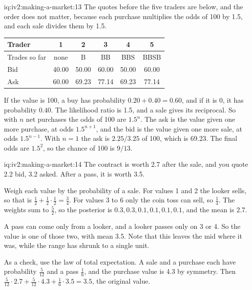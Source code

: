 \begin{solution}{iq:iv2:making-a-market:13}
The quotes before the five traders are below, and the order does not matter, because each purchase multiplies the odds of 100 by 1.5, and each sale divides them by 1.5.
\begin{center}\small
\begin{tabular}{@{}lccccc@{}}
Trader & 1 & 2 & 3 & 4 & 5 \\ \hline
Trades so far & none & B & BB & BBS & BBSB \\
Bid & 40.00 & 50.00 & 60.00 & 50.00 & 60.00 \\
Ask & 60.00 & 69.23 & 77.14 & 69.23 & 77.14
\end{tabular}
\end{center}

If the value is 100, a buy has probability $0.20 + 0.40 = 0.60$, and if it is 0, it has probability $0.40$. The likelihood ratio is 1.5, and a sale gives its reciprocal. So with $n$ net purchases the odds of 100 are $1.5^n$. The ask is the value given one more purchase, at odds $1.5^{n+1}$, and the bid is the value given one more sale, at odds $1.5^{n-1}$. With $n = 1$ the ask is $2.25/3.25$ of 100, which is 69.23. The final odds are $1.5^2$, so the chance of 100 is $9/13$.

\end{solution}

\begin{solution}{iq:iv2:making-a-market:14}
The contract is worth 2.7 after the sale, and you quote 2.2 bid, 3.2 asked. After a pass, it is worth 3.5.

Weigh each value by the probability of a sale. For values 1 and 2 the looker sells, so that is $\tfrac12 + \tfrac12 \cdot \tfrac12 = \tfrac34$. For values 3 to 6 only the coin toss can sell, so $\tfrac14$. The weights sum to $\tfrac52$, so the posterior is $0.3, 0.3, 0.1, 0.1, 0.1, 0.1$, and the mean is 2.7.

A pass can come only from a looker, and a looker passes only on 3 or 4. So the value is one of those two, with mean 3.5. Note that this leaves the mid where it was, while the range has shrunk to a single unit.

As a check, use the law of total expectation. A sale and a purchase each have probability $\tfrac{5}{12}$ and a pass $\tfrac16$, and the purchase value is 4.3 by symmetry. Then $\tfrac{5}{12} \cdot 2.7 + \tfrac{5}{12} \cdot 4.3 + \tfrac16 \cdot 3.5 = 3.5$, the original value.

\end{solution}

